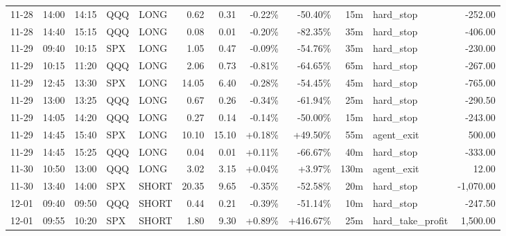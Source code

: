 \documentclass[11pt,a4paper,twoside]{article}
\begin{document}
\begin{center}
\begin{longtable}{>{\color{txtmain}}l l l l l r r r r r >{\color{txtmain}}l r}
11-28 & 14:00 & 14:15 & QQQ & LONG & 0.62 & 0.31 & \textcolor{lossred}{-0.22\%} & \textcolor{lossred}{-50.40\%} & 15m & hard\_stop & \textcolor{lossred}{-252.00} \\
11-28 & 14:40 & 15:15 & QQQ & LONG & 0.08 & 0.01 & \textcolor{lossred}{-0.20\%} & \textcolor{lossred}{-82.35\%} & 35m & hard\_stop & \textcolor{lossred}{-406.00} \\
11-29 & 09:40 & 10:15 & SPX & LONG & 1.05 & 0.47 & \textcolor{lossred}{-0.09\%} & \textcolor{lossred}{-54.76\%} & 35m & hard\_stop & \textcolor{lossred}{-230.00} \\
11-29 & 10:15 & 11:20 & QQQ & LONG & 2.06 & 0.73 & \textcolor{lossred}{-0.81\%} & \textcolor{lossred}{-64.65\%} & 65m & hard\_stop & \textcolor{lossred}{-267.00} \\
11-29 & 12:45 & 13:30 & SPX & LONG & 14.05 & 6.40 & \textcolor{lossred}{-0.28\%} & \textcolor{lossred}{-54.45\%} & 45m & hard\_stop & \textcolor{lossred}{-765.00} \\
11-29 & 13:00 & 13:25 & QQQ & LONG & 0.67 & 0.26 & \textcolor{lossred}{-0.34\%} & \textcolor{lossred}{-61.94\%} & 25m & hard\_stop & \textcolor{lossred}{-290.50} \\
11-29 & 14:05 & 14:20 & QQQ & LONG & 0.27 & 0.14 & \textcolor{lossred}{-0.14\%} & \textcolor{lossred}{-50.00\%} & 15m & hard\_stop & \textcolor{lossred}{-243.00} \\
11-29 & 14:45 & 15:40 & SPX & LONG & 10.10 & 15.10 & \textcolor{wingreen}{+0.18\%} & \textcolor{wingreen}{+49.50\%} & 55m & agent\_exit & \textcolor{wingreen}{500.00} \\
11-29 & 14:45 & 15:25 & QQQ & LONG & 0.04 & 0.01 & \textcolor{wingreen}{+0.11\%} & \textcolor{lossred}{-66.67\%} & 40m & hard\_stop & \textcolor{lossred}{-333.00} \\
11-30 & 10:50 & 13:00 & QQQ & LONG & 3.02 & 3.15 & \textcolor{wingreen}{+0.04\%} & \textcolor{wingreen}{+3.97\%} & 130m & agent\_exit & \textcolor{wingreen}{12.00} \\
11-30 & 13:40 & 14:00 & SPX & SHORT & 20.35 & 9.65 & \textcolor{lossred}{-0.35\%} & \textcolor{lossred}{-52.58\%} & 20m & hard\_stop & \textcolor{lossred}{-1,070.00} \\
12-01 & 09:40 & 09:50 & QQQ & SHORT & 0.44 & 0.21 & \textcolor{lossred}{-0.39\%} & \textcolor{lossred}{-51.14\%} & 10m & hard\_stop & \textcolor{lossred}{-247.50} \\
12-01 & 09:55 & 10:20 & SPX & SHORT & 1.80 & 9.30 & \textcolor{wingreen}{+0.89\%} & \textcolor{wingreen}{+416.67\%} & 25m & hard\_take\_profit & \textcolor{wingreen}{1,500.00} \\

\end{longtable}
\end{center}
\end{document}
